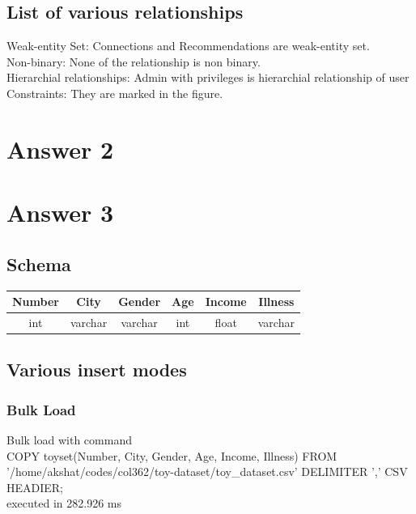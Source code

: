\documentclass[10pt]{article}
\begin{document}
\subsection{List of various relationships}

Weak-entity Set: Connections and Recommendations are weak-entity set. \\
Non-binary: None of the relationship is non binary. \\
Hierarchial relationships: Admin with privileges is hierarchial relationship of user \\
Constraints: They are marked in the figure. \\
\section{Answer 2}

\section{Answer 3}
\subsection{Schema}
\begin{center}
 \begin{tabular}{||c c c c c c||} 
 \hline
 Number & City & Gender & Age & Income & Illness \\  
 \hline\hline
 int & varchar & varchar &  int & float & varchar \\ 

 \hline
\end{tabular}
\end{center}
\subsection{Various insert modes}
\subsubsection{Bulk Load}
Bulk load with command \\
COPY toyset(Number, City, Gender, Age, Income, Illness) FROM \\ '/home/akshat/codes/col362/toy-dataset/toy\_dataset.csv'
DELIMITER ',' CSV HEADIER; \\
executed in 282.926 ms
\end{document}
